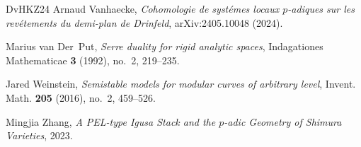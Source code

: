 \documentclass{article}
\theoremstyle{definition}
\begin{document}
\begin{thebibliography}{DvHKZ24}
Arnaud Vanhaecke, \emph{{Cohomologie de syst{\'e}mes locaux $ p $-adiques sur les rev{\'e}tements du demi-plan de Drinfeld}}, arXiv:2405.10048 (2024).

Marius van Der~Put, \emph{{Serre duality for rigid analytic spaces}}, Indagationes Mathematicae \textbf{3} (1992), no.~2, 219--235.

Jared Weinstein, \emph{Semistable models for modular curves of arbitrary level}, Invent. Math. \textbf{205} (2016), no.~2, 459--526. 

Mingjia Zhang, \emph{{A PEL-type Igusa Stack and the $p$-adic Geometry of Shimura Varieties}}, 2023.

\end{thebibliography}
\end{document}
